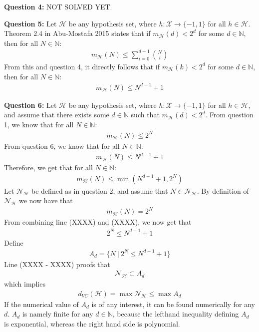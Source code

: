 \documentclass[12pt]{article}
\begin{document}
\textbf{Question 4:} NOT SOLVED YET.

\textbf{Question 5:} Let $\mathcal{H}$ be any hypothesis set, where $h:\mathcal{X}\to \{-1,1\}$ for all $h\in \mathcal{H}$. Theorem 2.4 in Abu-Mostafa 2015 states that if $m_\mathcal{H}(d) < 2^d$ for some $d \in \mathbb{N}$, then for all $N\in \mathbb{N}$:
\begin{align}
m_\mathcal{H}(N) \leq \sum_{i=0}^{d-1} \binom{N}{i}
\end{align}
From this and question 4, it directly follows that if $m_\mathcal{H}(k) < 2^d$ for some $d \in \mathbb{N}$, then for all $N\in \mathbb{N}$:
\begin{align}
m_\mathcal{H}(N) \leq N^{d-1} + 1
\end{align}

\textbf{Question 6:} Let $\mathcal{H}$ be any hypothesis set, where $h:\mathcal{X}\to \{-1,1\}$ for all $h\in \mathcal{H}$, and assume that there exists some $d\in \mathbb{N}$ such that $m_\mathcal{H}(d) < 2^d$. From question 1, we know that for all $N\in \mathbb{N}$:
\begin{align}
m_\mathcal{H}(N) \leq 2^N
\end{align}
From question 6, we know that for all $N\in \mathbb{N}$:
\begin{align}
m_\mathcal{H}(N) \leq N^{d-1} + 1
\end{align}
Therefore, we get that for all $N\in \mathbb{N}$:
\begin{align}
m_\mathcal{H}(N) \leq \min (N^{d-1} + 1, 2^N)
\end{align}
Let $\mathcal{N}_\mathcal{H}$ be defined as in question 2, and assume that $N \in \mathcal{N}_\mathcal{H}$. By definition of $\mathcal{N}_\mathcal{H}$ we now have that
\begin{align}
m_\mathcal{H}(N)=2^N 
\end{align}
From combining line (XXXX) and (XXXX), we now get that
\begin{align}
2^N \leq N^{d-1} + 1
\end{align}
Define 
\begin{align}
A_d = \{N \ |\  2^N \leq N^{d-1} + 1\}
\end{align}
Line (XXXX - XXXX) proofs that
\begin{align}
\mathcal{N}_\mathcal{H}\subset A_d
\end{align}
which implies
\begin{align}
d_{VC}(\mathcal{H}) = \max \mathcal{N}_\mathcal{H} \leq \max A_d
\end{align}
If the numerical value of $A_d$ is of any interest, it can be found numerically for any $d$. $A_d$ is namely finite for any $d\in \mathbb{N}$, because the lefthand inequality defining $A_d$ is exponential, whereas the right hand side is polynomial.
\end{document}
